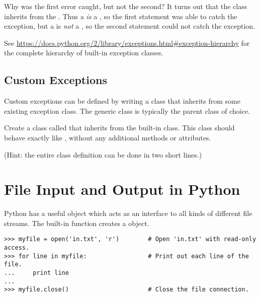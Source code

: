 Why was the first error caught, but not the second?
It turns out that the  class inherits from the .
Thus a  \emph{is} a , so the first  statement was able to catch the exception, but a  is \emph{not} a , so the second  statement could not catch the exception.

See \url{https://docs.python.org/2/library/exceptions.html#exception-hierarchy} for the complete hierarchy of built-in exception classes.

\subsection*{Custom Exceptions}

Custom exceptions can be defined by writing a class that inherits from some existing exception class.
The generic  class is typically the parent class of choice.

\begin{problem}
Create a class called  that inherits from the built-in  class.
This class should behave exactly like , without any additional methods or attributes.

(Hint: the entire class definition can be done in two short lines.)
\end{problem}


\section*{File Input and Output in Python}

Python has a useful  object which acts as an interface to all kinds of different file streams.
The built-in function  creates a  object.

\begin{lstlisting}
>>> myfile = open('in.txt', 'r')        # Open 'in.txt' with read-only access.
>>> for line in myfile:                 # Print out each line of the file.
...     print line
...
>>> myfile.close()                      # Close the file connection.
\end{lstlisting}

